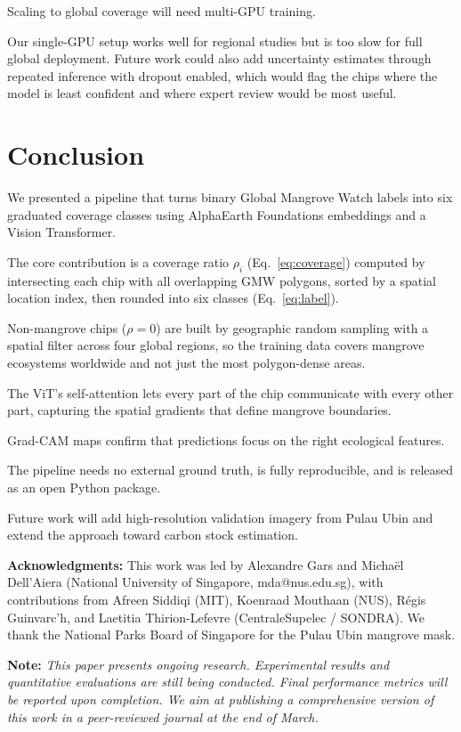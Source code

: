 \documentclass[conference,a4paper]{IEEEtran}
\begin{document}
Scaling to global coverage will need multi-GPU training. 

Our single-GPU setup works well for regional studies but is too slow for full global deployment. 
Future work could also add uncertainty estimates through repeated inference with dropout enabled, which would flag the chips where the model is least confident and where expert review would be most useful.

\section{Conclusion}

We presented a pipeline that turns binary Global Mangrove Watch labels into six graduated coverage classes using AlphaEarth Foundations embeddings and a Vision Transformer. 

The core contribution is a coverage ratio $\rho_i$ (Eq.~\ref{eq:coverage}) computed by intersecting each chip with all overlapping GMW polygons, 
sorted by a spatial location index, 
then rounded into six classes (Eq.~\ref{eq:label}). 

Non-mangrove chips ($\rho = 0$) are built by geographic random sampling with a spatial filter across four global regions, 
so the training data covers mangrove ecosystems worldwide and not just the most polygon-dense areas.

The ViT's self-attention lets every part of the chip communicate with every other part, capturing the spatial gradients that define mangrove boundaries. 

Grad-CAM maps confirm that predictions focus on the right ecological features. 

The pipeline needs no external ground truth, is fully reproducible, and is released as an open Python package. 

Future work will add high-resolution validation imagery from Pulau Ubin and extend the approach toward carbon stock estimation.

\vspace{0.3cm}

\textbf{Acknowledgments:}
This work was led by Alexandre Gars and Micha\"el Dell'Aiera (National University of Singapore, mda@nus.edu.sg), 
with contributions from Afreen Siddiqi (MIT), Koenraad Mouthaan (NUS), 
R\'egis Guinvarc'h, and Laetitia Thirion-Lefevre (CentraleSupelec / SONDRA). 
We thank the National Parks Board of Singapore for the Pulau Ubin mangrove mask.

\vspace{0.3cm}
\noindent\textbf{Note:} \textit{This paper presents ongoing research. Experimental results and quantitative evaluations are still being conducted. Final performance metrics will be reported upon completion. We aim at publishing a comprehensive version of this work in a peer-reviewed journal at the end of March.}

\small


\end{document}
